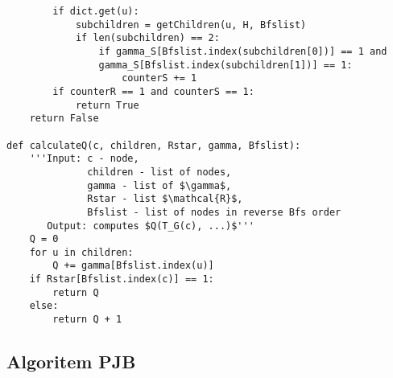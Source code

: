 \documentclass[12pt,a4paper,twoside]{article}
\theoremstyle{definition} %
\theoremstyle{plain} %
\numberwithin{equation}{section}  %
\begin{document}
\begin{verbatim}
        if dict.get(u):
            subchildren = getChildren(u, H, Bfslist)
            if len(subchildren) == 2:
                if gamma_S[Bfslist.index(subchildren[0])] == 1 and
                gamma_S[Bfslist.index(subchildren[1])] == 1:
                    counterS += 1
        if counterR == 1 and counterS == 1:
            return True
    return False

def calculateQ(c, children, Rstar, gamma, Bfslist):
    '''Input: c - node, 
              children - list of nodes,
              gamma - list of $\gamma$,
              Rstar - list $\mathcal{R}$,
              Bfslist - list of nodes in reverse Bfs order
       Output: computes $Q(T_G(c), ...)$'''
    Q = 0
    for u in children:
        Q += gamma[Bfslist.index(u)]
    if Rstar[Bfslist.index(c)] == 1:
        return Q
    else:
        return Q + 1
\end{verbatim}


\subsection*{Algoritem PJB}
\end{document}
